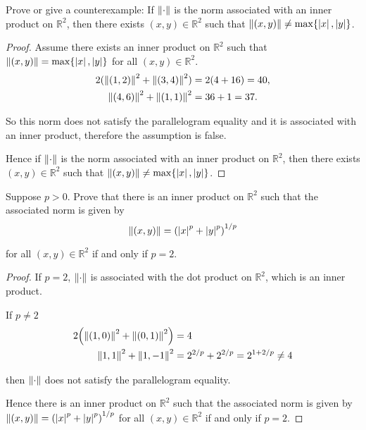 \begin{exercise}
    Prove or give a counterexample: If $\left\Vert{\cdot}\right\Vert$ is the norm associated with an inner product on $\mathbb{R}^{2}$, then there exists $(x, y) \in \mathbb{R}^{2}$ such that $\left\Vert{(x, y)}\right\Vert \ne \max\{ \left\vert{x}\right\vert, \left\vert{y}\right\vert \}$.
\end{exercise}

\begin{proof}
    Assume there exists an inner product on $\mathbb{R}^{2}$ such that $\left\Vert{(x, y)}\right\Vert = \max\{ \left\vert{x}\right\vert, \left\vert{y}\right\vert \}$ for all $(x, y)\in \mathbb{R}^{2}$.
    \begin{align*}
        2(\left\Vert{(1, 2)}\right\Vert^{2} + \left\Vert{(3, 4)}\right\Vert^{2}) & = 2(4 + 16) = 40, \\
        \left\Vert{(4, 6)}\right\Vert^{2} + \left\Vert{(1, 1)}\right\Vert^{2}    & = 36 + 1 = 37.
    \end{align*}

    So this norm does not satisfy the parallelogram equality and it is associated with an inner product, therefore the assumption is false.

    Hence if $\left\Vert{\cdot}\right\Vert$ is the norm associated with an inner product on $\mathbb{R}^{2}$, then there exists $(x, y) \in \mathbb{R}^{2}$ such that $\left\Vert{(x, y)}\right\Vert \ne \max\{ \left\vert{x}\right\vert, \left\vert{y}\right\vert \}$.
\end{proof}
\newpage

\begin{exercise}
    Suppose $p > 0$. Prove that there is an inner product on $\mathbb{R}^{2}$ such that the associated norm is given by
    \[
        \left\Vert{(x, y)}\right\Vert = {\left(\left\vert{x}\right\vert^{p} + \left\vert{y}\right\vert^{p}\right)}^{1/p}
    \]

    for all $(x, y)\in\mathbb{R}^{2}$ if and only if $p = 2$.
\end{exercise}

\begin{proof}
    If $p = 2$, $\left\Vert{\cdot}\right\Vert$ is associated with the dot product on $\mathbb{R}^{2}$, which is an inner product.

    If $p\ne 2$
    \begin{align*}
        2{\left( \left\Vert{(1, 0)}\right\Vert^{2} + \left\Vert{(0, 1)}\right\Vert^{2} \right)} & = 4                                   \\
        \left\Vert{1,1}\right\Vert^{2} + \left\Vert{1,-1}\right\Vert^{2}                        & = 2^{2/p} + 2^{2/p} = 2^{1+2/p} \ne 4
    \end{align*}

    then $\left\Vert{\cdot}\right\Vert$ does not satisfy the parallelogram equality.

    Hence there is an inner product on $\mathbb{R}^{2}$ such that the associated norm is given by $\left\Vert{(x, y)}\right\Vert = {\left(\left\vert{x}\right\vert^{p} + \left\vert{y}\right\vert^{p}\right)}^{1/p}$ for all $(x, y)\in\mathbb{R}^{2}$ if and only if $p = 2$.
\end{proof}
\newpage

